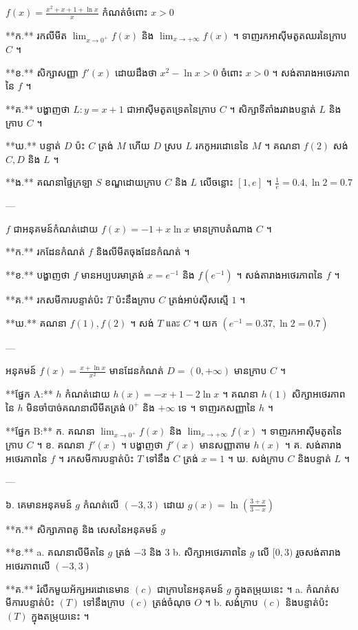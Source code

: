 

$f(x) = \frac{x^2 + x + 1 + \ln x}{x}$ កំណត់ចំពោះ $x > 0$

**ក.** រកលីមីត $\lim_{x \to 0^+} f(x)$ និង $\lim_{x \to +\infty} f(x)$ ។ ទាញរកអាស៊ីមតូតឈរនៃក្រាប $C$ ។

**ខ.** សិក្សាសញ្ញា $f'(x)$ ដោយដឹងថា $x^2 - \ln x > 0$ ចំពោះ $x > 0$ ។ សង់តារាងអថេរភាពនៃ $f$ ។

**គ.** បង្ហាញថា $L: y = x + 1$ ជាអាស៊ីមតូតទ្រេតនៃក្រាប $C$ ។ សិក្សាទីតាំងរវាងបន្ទាត់ $L$ និង ក្រាប $C$ ។

**ឃ.** បន្ទាត់ $D$ ប៉ះ $C$ ត្រង់ $M$ ហើយ $D$ ស្រប $L$ រកកូអរដោនេនៃ $M$ ។ គណនា $f(2)$ សង់ $C, D$ និង $L$ ។

**ង.** គណនាផ្ទៃក្រឡា $S$ ខណ្ឌដោយក្រាប $C$ និង $L$ លើចន្លោះ $[1, e]$ ។ $\frac{1}{e} = 0.4, \ln 2 = 0.7$

---

$f$ ជាអនុគមន៍កំណត់ដោយ $f(x) = -1 + x \ln x$ មានក្រាបតំណាង $C$ ។

**ក.** រកដែនកំណត់ $f$ និងលីមីតចុងដែនកំណត់ ។

**ខ.** បង្ហាញថា $f$ មានអប្បបរមាត្រង់ $x = e^{-1}$ និង $f(e^{-1})$ ។ សង់តារាងអថេរភាពនៃ $f$ ។

**គ.** រកសមីការបន្ទាត់ប៉ះ $T$ ប៉ះនឹងក្រាប $C$ ត្រង់អាប់ស៊ីសស្មើ $1$ ។

**ឃ.** គណនា $f(1), f(2)$ ។ សង់ $T$ และ $C$ ។ យក $(e^{-1} = 0.37, \ln 2 = 0.7)$

---

អនុគមន៍ $f(x) = \frac{x + \ln x}{x^2}$ មានដែនកំណត់ $D = (0, +\infty)$ មានក្រាប $C$ ។

**ផ្នែក A:** $h$ កំណត់ដោយ $h(x) = -x + 1 - 2\ln x$ ។ គណនា $h(1)$ សិក្សាអថេរភាពនៃ $h$ មិនចាំបាច់គណនាលីមីតត្រង់ $0^+$ និង $+\infty$ ទេ ។ ទាញរកសញ្ញានៃ $h$ ។

**ផ្នែក B:**
ក. គណនា $\lim_{x \to 0^+} f(x)$ និង $\lim_{x \to +\infty} f(x)$ ។ ទាញរកអាស៊ីមតូតនៃក្រាប $C$ ។
ខ. គណនា $f'(x)$ ។ បង្ហាញថា $f'(x)$ មានសញ្ញាតាម $h(x)$ ។
គ. សង់តារាងអថេរភាពនៃ $f$ ។ រកសមីការបន្ទាត់ប៉ះ $T$ ទៅនឹង $C$ ត្រង់ $x = 1$ ។
ឃ. សង់ក្រាប $C$ និងបន្ទាត់ $L$ ។

---

៦. គេមានអនុគមន៍ $g$ កំណត់លើ $(-3, 3)$ ដោយ $g(x) = \ln \left( \frac{3+x}{3-x} \right)$

**ក.** សិក្សាភាពគូ និង សេសនៃអនុគមន៍ $g$

**ខ.** a. គណនាលីមីតនៃ $g$ ត្រង់ $-3$ និង $3$
   b. សិក្សាអថេរភាពនៃ $g$ លើ $[0, 3)$ រួចសង់តារាងអថេរភាពលើ $(-3, 3)$

**គ.** រំលឹកមួយអ័ក្សអរដោនេមាន $(c)$ ជាក្រាបនៃអនុគមន៍ $g$ ក្នុងតម្រុយនេះ ។
   a. កំណត់សមីការបន្ទាត់ប៉ះ $(T)$ ទៅនឹងក្រាប $(c)$ ត្រង់ចំណុច $O$ ។
   b. សង់ក្រាប $(c)$ និងបន្ទាត់ប៉ះ $(T)$ ក្នុងតម្រុយនេះ ។


